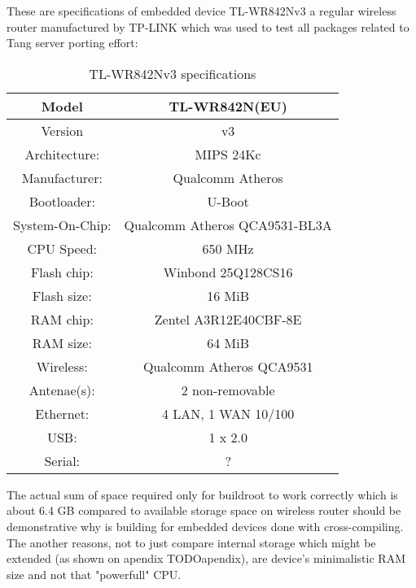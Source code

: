 These are specifications of embedded device TL-WR842Nv3 a regular wireless router manufactured by TP-LINK which was used to test all packages related to Tang server porting effort:

\begin{table}[h]
\centering
\label{routerspec}
\begin{tabular}{c|c}
\hline
Model           &   TL-WR842N(EU)                   \\ \hline
Version         &   v3                              \\ \hline
Architecture:   &   MIPS 24Kc                       \\ \hline
Manufacturer:   &   Qualcomm Atheros                \\ \hline
Bootloader:     &   U-Boot                          \\ \hline
System-On-Chip: &   Qualcomm Atheros QCA9531-BL3A   \\ \hline
CPU Speed:      &   650 MHz                         \\ \hline
Flash chip:     &   Winbond 25Q128CS16              \\ \hline
Flash size:     &   16 MiB                          \\ \hline
RAM chip:       &   Zentel A3R12E40CBF-8E           \\ \hline
RAM size:       &   64 MiB                          \\ \hline
Wireless:       &   Qualcomm Atheros QCA9531        \\ \hline
Antenae(s):     &   2 non-removable                 \\ \hline
Ethernet:       &   4 LAN, 1 WAN 10/100             \\ \hline
USB:            &   1 x 2.0                         \\ \hline
Serial:         &   ?                               \\ \hline
\end{tabular}
\caption{TL-WR842Nv3 specifications}
\end{table}

The actual sum of space required only for buildroot to work correctly which is about 6.4 GB compared to available storage space on wireless router should be demonstrative why is building for embedded devices done with cross-compiling.
The another reasons, not to just compare internal storage which might be extended (as shown on apendix TODOapendix), are device's minimalistic RAM size and not that "powerfull" CPU.

